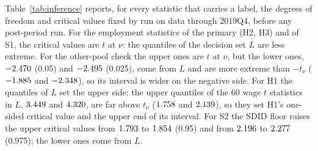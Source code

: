 Table~\ref{tab:inference} reports, for every statistic that carries a label, the degrees of
freedom and critical values fixed by run  on data through 2019Q4, before any
post-period run. For the employment statistics of the primary (H2, H3) and of S1, the critical
values are $t$ at $\nu$: the quantiles of the decision set $L$ are less extreme. For the other-pool
check the upper ones are $t$ at $\nu$, but the lower ones, $-2.470$ (0.05) and
$-2.495$ (0.025), come from $L$ and are more extreme than $-t_\nu$
($-1.885$ and $-2.348$), so its interval is wider on the
negative side. For H1 the quantiles of $L$ set the upper side: the upper quantiles of the 60 wage $t$ statistics in $L$,
$3.449$ and $4.320$, are far above $t_\nu$ ($1.758$ and
$2.139$), so they set H1's one-sided critical value and the upper end of its
interval. For S2 the SDID floor raises the upper critical values from
$1.793$ to $1.854$ (0.95) and from
$2.196$ to $2.277$ (0.975); the lower ones come
from $L$.

